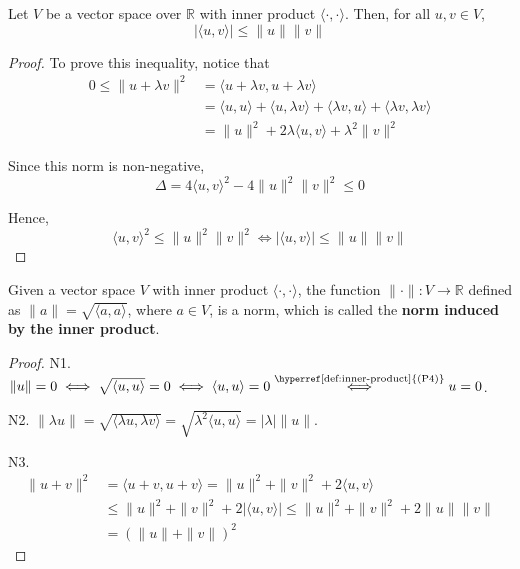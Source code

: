 \begin{lemma}\label{cauchy-schwarz-ip}
	Let $V$ be a vector space over $\mathbb{R}$ with inner product $\langle \cdot, \cdot \rangle$. Then, for all $u, v \in V$,
	\begin{equation*}
		|\langle u, v \rangle| \leq \| u \| \| v \|
	\end{equation*}
\end{lemma}

\begin{proof}
	To prove this inequality, notice that
	\begin{equation*}
		\begin{aligned}
			0 \leq \| u + \lambda v \|^2 &= \langle u + \lambda v, u + \lambda v \rangle \\
			&= \langle u, u \rangle + \langle u, \lambda v \rangle + \langle \lambda v, u \rangle + \langle \lambda v, \lambda v \rangle \\
			&= \| u \|^2 + 2 \lambda \langle u, v \rangle + \lambda^2 \| v \|^2
		\end{aligned}
	\end{equation*}
	
	Since this norm is non-negative,
	\[
		\Delta = 4 \langle u, v \rangle^2 - 4 \|u \|^2 \|v \|^2 \leq 0
	\]
	
	Hence,
	\[
		\langle u, v \rangle^2 \leq \| u \|^2 \| v \|^2 \iff | \langle u, v \rangle | \leq \| u \| \|v \|
	\]
\end{proof}

\begin{proposition}
	Given a vector space $V$ with inner product $\langle \cdot, \cdot \rangle$, the function $\| \cdot \| : V \longrightarrow \mathbb{R}$ defined as $\| a \| = \sqrt{\langle a, a \rangle}$, where $a \in V$, is a norm, which is called the \textbf{norm induced by the inner product}.
\end{proposition}

\begin{proof}
	N1. $ \| u \| = 0 \iff \sqrt{\langle u, u \rangle} = 0 \iff \langle u, u \rangle = 0 \overset{\text{\hyperref[def:inner-product]{(P4)}}}{\iff} u = 0$.
	
	N2. $\| \lambda u \| = \sqrt{\langle \lambda u, \lambda v \rangle} = \sqrt{\lambda^2 \langle u, u \rangle} = | \lambda | \| u \|$.
	
	N3. \begin{equation*}
		\begin{aligned}
			\| u + v \|^2 &= \langle u+v, u+v \rangle = \| u \|^2 + \| v \|^2 + 2 \langle u, v \rangle \\
			&\leq \| u \|^2 + \| v \|^2 + 2 | \langle u, v \rangle | \leq \| u \|^2 + \| v \|^2 + 2 \| u \| \| v \| \\
			&= (\|u\| + \|v\|)^2
		\end{aligned}
	\end{equation*}
\end{proof}

